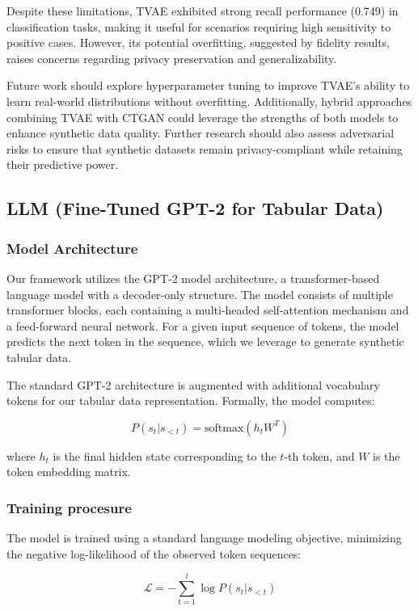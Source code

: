 \documentclass{article}
\begin{document}
Despite these limitations, TVAE exhibited strong recall performance (0.749) in classification tasks, making it useful for scenarios requiring high sensitivity to positive cases. However, its potential overfitting, suggested by fidelity results, raises concerns regarding privacy preservation and generalizability.

Future work should explore hyperparameter tuning to improve TVAE’s ability to learn real-world distributions without overfitting. Additionally, hybrid approaches combining TVAE with CTGAN could leverage the strengths of both models to enhance synthetic data quality. Further research should also assess adversarial risks to ensure that synthetic datasets remain privacy-compliant while retaining their predictive power.


\subsection{LLM (Fine-Tuned GPT-2 for Tabular Data)}

\subsubsection[short]{Model Architecture}
Our framework utilizes the GPT-2 model architecture, a transformer-based language model with a decoder-only structure. The model consists of multiple transformer blocks, each containing a multi-headed self-attention mechanism and a feed-forward neural network. For a given input sequence of tokens, the model predicts the next token in the sequence, which we leverage to generate synthetic tabular data.

The standard GPT-2 architecture is augmented with additional vocabulary tokens for our tabular data representation. Formally, the model computes:

\begin{equation}
P(s_t | s_{<t}) = \text{softmax}(h_t W^T)
\end{equation}

where $h_t$ is the final hidden state corresponding to the $t$-th token, and $W$ is the token embedding matrix.
\subsubsection[short]{Training procesure}
The model is trained using a standard language modeling objective, minimizing the negative log-likelihood of the observed token sequences:

\begin{equation}
\mathcal{L} = -\sum_{t=1}^{l} \log P(s_t | s_{<t})
\end{equation}
\end{document}
